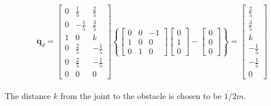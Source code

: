 \begin{equation}
    \mathbf{\ddot{q}}_d =
    \begin{bmatrix}
        0 & \frac{1}{5} & \frac{2}{5}\\
        0 & -\frac{1}{5} & \frac{3}{5}\\
        1 & 0 & k \\
        0 & \frac{2}{5} & -\frac{1}{5}\\
        0 & \frac{2}{5} & -\frac{1}{5} \\
        0 & 0 & 0
    \end{bmatrix}\left\{
    \begin{bmatrix}
        0 & 0 & -1\\
        1 & 0 & 0\\
        0 & 1 & 0
    \end{bmatrix}
    \begin{bmatrix}
        0\\   1\\   0
    \end{bmatrix}-
    \begin{bmatrix}
        0\\   0\\   0
    \end{bmatrix}\right\}=
    \begin{bmatrix}
        \frac{2}{5}\\
        \frac{3}{5}\\
        k \\
        -\frac{1}{5}\\
        -\frac{1}{5} \\
        0
    \end{bmatrix}
\end{equation}
\\
The distance $k$ from the joint to the obstacle is chosen to be $1/2 m$.
